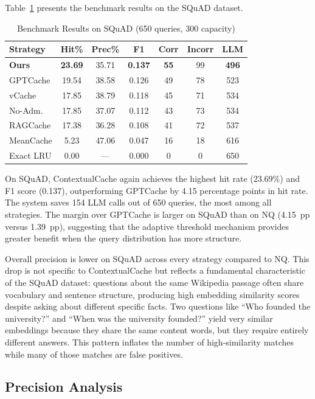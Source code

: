 \documentclass[conference]{IEEEtran}
\begin{document}
Table~\ref{tab:squad} presents the benchmark results on the SQuAD dataset.

\begin{table}[t]
\centering
\caption{Benchmark Results on SQuAD (650 queries, 300 capacity)}
\label{tab:squad}
\begin{tabular}{lcccccc}
\toprule
\textbf{Strategy} & \textbf{Hit\%} & \textbf{Prec\%} & \textbf{F1} & \textbf{Corr} & \textbf{Incorr} & \textbf{LLM} \\
\midrule
\textbf{Ours} & \textbf{23.69} & 35.71 & \textbf{0.137} & \textbf{55} & 99 & \textbf{496} \\
GPTCache & 19.54 & 38.58 & 0.126 & 49 & 78 & 523 \\
vCache & 17.85 & 38.79 & 0.118 & 45 & 71 & 534 \\
No-Adm. & 17.85 & 37.07 & 0.112 & 43 & 73 & 534 \\
RAGCache & 17.38 & 36.28 & 0.108 & 41 & 72 & 537 \\
MeanCache & 5.23 & 47.06 & 0.047 & 16 & 18 & 616 \\
Exact LRU & 0.00 & --- & 0.000 & 0 & 0 & 650 \\
\bottomrule
\end{tabular}
\end{table}

On SQuAD, ContextualCache again achieves the highest hit rate (23.69\%) and F1 score (0.137), outperforming GPTCache by 4.15 percentage points in hit rate. The system saves 154 LLM calls out of 650 queries, the most among all strategies. The margin over GPTCache is larger on SQuAD than on NQ (4.15~pp versus 1.39~pp), suggesting that the adaptive threshold mechanism provides greater benefit when the query distribution has more structure.

Overall precision is lower on SQuAD across every strategy compared to NQ. This drop is not specific to ContextualCache but reflects a fundamental characteristic of the SQuAD dataset: questions about the same Wikipedia passage often share vocabulary and sentence structure, producing high embedding similarity scores despite asking about different specific facts. Two questions like ``Who founded the university?'' and ``When was the university founded?'' yield very similar embeddings because they share the same content words, but they require entirely different answers. This pattern inflates the number of high-similarity matches while many of those matches are false positives.

\subsection{Precision Analysis}
\end{document}
